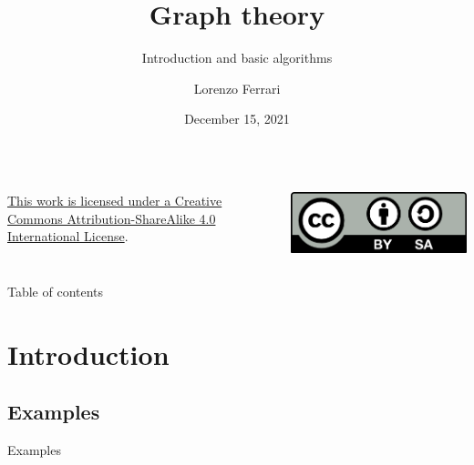 \documentclass[compress]{beamer}
\title{Graph theory}
\subtitle{Introduction and basic algorithms}
\author{Lorenzo Ferrari}
\institute{Campus Bornholm}
\date{December 15, 2021}
\begin{document}
\begin{frame}
  \maketitle
  \begin{columns}
    \begin{flushleft}
      \small{\href{https://creativecommons.org/licenses/by-sa/4.0/}{This work is licensed under a Creative Commons Attribution-ShareAlike 4.0 International License}.}
    \end{flushleft}
    \begin{flushright}
      \includegraphics[scale=0.7]{pics/by-sa.png}
    \end{flushright}
  \end{columns}
\end{frame}

\begin{frame}{Table of contents}
  \tableofcontents
\end{frame}


\section{Introduction}

\subsection{Examples}

\begin{frame}{Examples}
  \begin{columns}
    \begin{center}
    \scalebox{0.7}{}
    \end{center}
    \begin{center}
    \scalebox{0.7}{}
    \end{center}
    \begin{center}
    \scalebox{0.7}{}
    \end{center}
    \begin{center}
    \scalebox{0.7}{}
    \end{center}
  \end{columns}
\end{frame}
\end{document}
